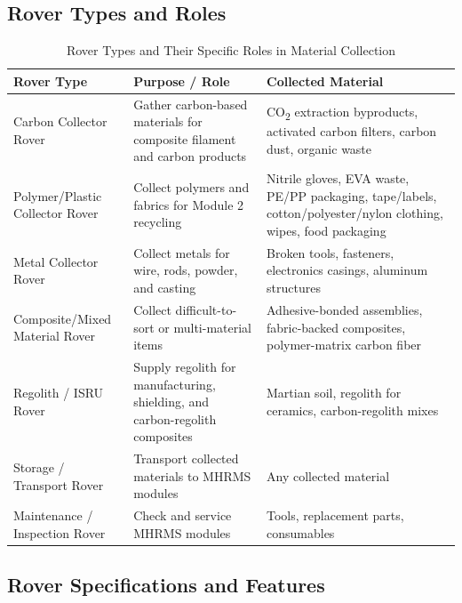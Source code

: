 \documentclass[12pt, a4paper]{article}
\begin{document}
\subsection{Rover Types and Roles}

\begin{table}[h!]
\centering
\small
\renewcommand{\arraystretch}{1.4}
\setlength{\tabcolsep}{8pt}
\begin{tabular}{p{} p{} p{}}
\toprule
\textbf{Rover Type} & \textbf{Purpose / Role} & \textbf{Collected Material} \\
\midrule
Carbon Collector Rover & Gather carbon-based materials for composite filament and carbon products & CO\textsubscript{2} extraction byproducts, activated carbon filters, carbon dust, organic waste \\[0.5em]

Polymer/Plastic Collector Rover & Collect polymers and fabrics for Module 2 recycling & Nitrile gloves, EVA waste, PE/PP packaging, tape/labels, cotton/polyester/nylon clothing, wipes, food packaging \\[0.5em]

Metal Collector Rover & Collect metals for wire, rods, powder, and casting & Broken tools, fasteners, electronics casings, aluminum structures \\[0.5em]

Composite/Mixed Material Rover & Collect difficult-to-sort or multi-material items & Adhesive-bonded assemblies, fabric-backed composites, polymer-matrix carbon fiber \\[0.5em]

Regolith / ISRU Rover & Supply regolith for manufacturing, shielding, and carbon-regolith composites & Martian soil, regolith for ceramics, carbon-regolith mixes \\[0.5em]

Storage / Transport Rover & Transport collected materials to MHRMS modules & Any collected material \\[0.5em]

Maintenance / Inspection Rover & Check and service MHRMS modules & Tools, replacement parts, consumables \\
\bottomrule
\end{tabular}
\caption{Rover Types and Their Specific Roles in Material Collection}
\end{table}

\normalsize

\subsection{Rover Specifications and Features}
\end{document}
